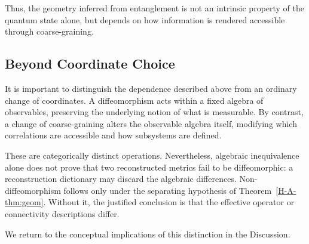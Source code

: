 \documentclass[12pt,a4paper,openany]{book}
\begin{document}
Thus, the geometry inferred from entanglement is not an intrinsic property of the quantum state alone, but depends on how information is rendered accessible through coarse-graining.

\subsection{Beyond Coordinate Choice}

It is important to distinguish the dependence described above from an ordinary change of coordinates.
A diffeomorphism acts within a fixed algebra of observables, preserving the underlying notion of what is measurable.
By contrast, a change of coarse-graining alters the observable algebra itself, modifying which correlations are accessible and how subsystems are defined.

These are categorically distinct operations.  Nevertheless, algebraic inequivalence alone does not prove that two reconstructed metrics fail to be diffeomorphic: a reconstruction dictionary may discard the algebraic differences.  Non-diffeomorphism follows only under the separating hypothesis of Theorem~\ref{H-A-thm:geom}.  Without it, the justified conclusion is that the effective operator or connectivity descriptions differ.

We return to the conceptual implications of this distinction in the Discussion.
\end{document}
